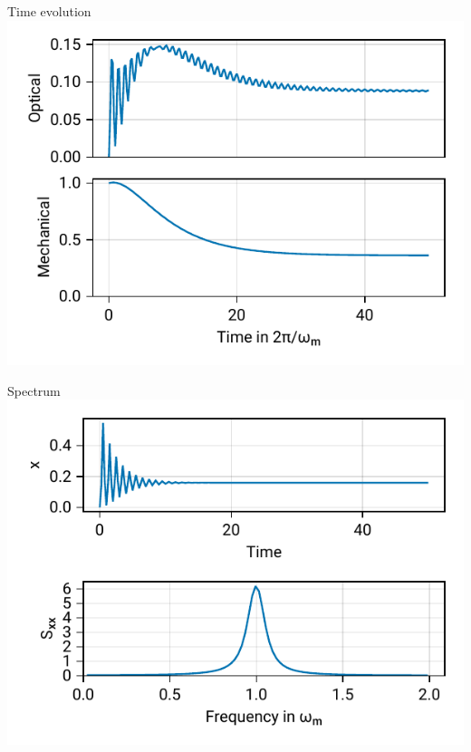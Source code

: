 \documentclass{beamer}
\begin{document}
\begin{frame}{Time evolution}
	\centering
	\includegraphics{figures/01 cooling.pdf}
\end{frame}


\begin{frame}{Spectrum}
	\centering
	\includegraphics{figures/02 spectrum.pdf}
\end{frame}
\end{document}
